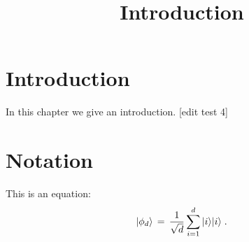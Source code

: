 

%


\title{Introduction}
\label{introduction}


\maketitle

\label{section-phantom}

\tableofcontents

\section{Introduction}
\label{section:introduction}

In this chapter we give an introduction. [edit test 4]

\section{Notation}
\label{section-notation}

This is an equation:
\begin{equation}
\label{eq:me-state}
 |\phi_d\rangle \,=\,\frac{1}{\sqrt{d}} \sum_{i=1}^d |i\rangle|i\rangle\;.
\end{equation}








